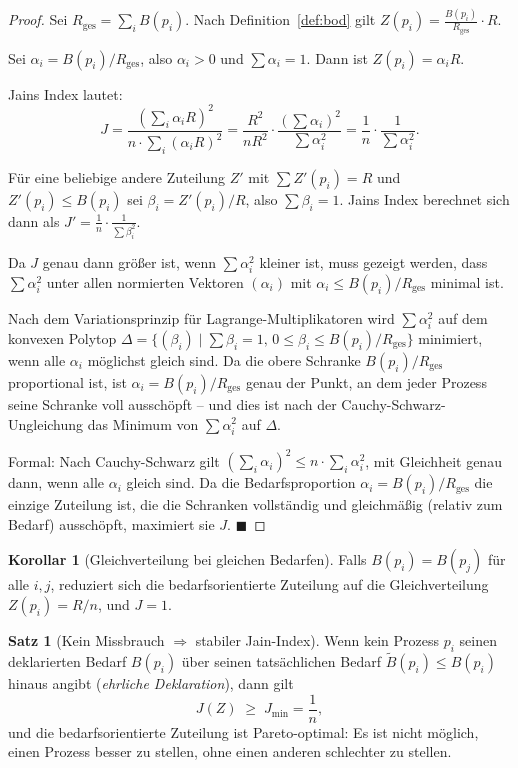 ﻿\documentclass[a4paper,12pt]{article}
\theoremstyle{definition}
\newtheorem{satz}{Satz}
\newtheorem{korollar}{Korollar}
\begin{document}
\begin{proof}
Sei $R_{\mathrm{ges}} = \sum_i B(p_i)$.
Nach Definition~\ref{def:bod} gilt $Z(p_i) = \frac{B(p_i)}{R_{\mathrm{ges}}} \cdot R$.

Sei $\alpha_i = B(p_i)/R_{\mathrm{ges}}$, also $\alpha_i > 0$ und
$\sum \alpha_i = 1$. Dann ist $Z(p_i) = \alpha_i R$.

Jains Index lautet:
\[
  J = \frac{(\sum_i \alpha_i R)^2}{n \cdot \sum_i (\alpha_i R)^2}
    = \frac{R^2}{n R^2} \cdot \frac{(\sum \alpha_i)^2}{\sum \alpha_i^2}
    = \frac{1}{n} \cdot \frac{1}{\sum \alpha_i^2}.
\]

Für eine beliebige andere Zuteilung $Z'$ mit $\sum Z'(p_i) = R$ und
$Z'(p_i) \leq B(p_i)$ sei $\beta_i = Z'(p_i)/R$, also $\sum \beta_i = 1$.
Jains Index berechnet sich dann als $J' = \frac{1}{n} \cdot \frac{1}{\sum \beta_i^2}$.

Da $J$ genau dann größer ist, wenn $\sum \alpha_i^2$ kleiner ist, muss
gezeigt werden, dass $\sum \alpha_i^2$ unter allen normierten
Vektoren $(\alpha_i)$ mit $\alpha_i \leq B(p_i)/R_{\mathrm{ges}}$ minimal ist.

Nach dem Variationsprinzip für Lagrange-Multiplikatoren wird
$\sum \alpha_i^2$ auf dem konvexen Polytop
$\Delta = \{(\beta_i) \mid \sum \beta_i = 1,\, 0 \leq \beta_i \leq B(p_i)/R_{\mathrm{ges}}\}$
minimiert, wenn alle $\alpha_i$ möglichst gleich sind.
Da die obere Schranke $B(p_i)/R_{\mathrm{ges}}$ proportional ist, ist
$\alpha_i = B(p_i)/R_{\mathrm{ges}}$ genau der Punkt, an dem jeder
Prozess seine Schranke voll ausschöpft -- und dies ist nach der
Cauchy-Schwarz-Ungleichung das Minimum von $\sum \alpha_i^2$ auf $\Delta$.

Formal: Nach Cauchy-Schwarz gilt
$(\sum_i \alpha_i)^2 \leq n \cdot \sum_i \alpha_i^2$, mit Gleichheit
genau dann, wenn alle $\alpha_i$ gleich sind.
Da die Bedarfsproportion $\alpha_i = B(p_i)/R_{\mathrm{ges}}$ die
einzige Zuteilung ist, die die Schranken vollständig und gleichmäßig
(relativ zum Bedarf) ausschöpft, maximiert sie $J$.
\hfill$\blacksquare$
\end{proof}

\begin{korollar}[Gleichverteilung bei gleichen Bedarfen]
Falls $B(p_i) = B(p_j)$ für alle $i, j$, reduziert sich die
bedarfsorientierte Zuteilung auf die Gleichverteilung
$Z(p_i) = R/n$, und $J = 1$.
\end{korollar}

\begin{satz}[Kein Missbrauch $\Rightarrow$ stabiler Jain-Index]
\label{satz:kein_missbrauch}
Wenn kein Prozess $p_i$ seinen deklarierten Bedarf $B(p_i)$ über
seinen tatsächlichen Bedarf $\tilde{B}(p_i) \leq B(p_i)$ hinaus
angibt (\emph{ehrliche Deklaration}), dann gilt
\[
  J(Z) \;\geq\; J_{\min} = \frac{1}{n},
\]
und die bedarfsorientierte Zuteilung ist Pareto-optimal: Es ist
nicht möglich, einen Prozess besser zu stellen, ohne einen anderen
schlechter zu stellen.
\end{satz}
\end{document}
